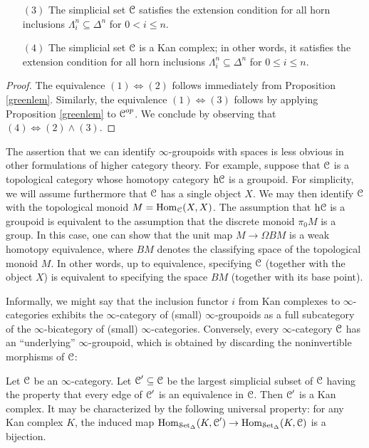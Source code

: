 \begin{Didn't Read}
\begin{proposition}
\begin{itemize}
\item[$(3)$] The simplicial set $\operatorname{\mathcal{C}}$ satisfies the extension condition
for all horn inclusions $\Lambda^n_i \subseteq \Delta^n$ for $0 < i \leq n$.

\item[$(4)$] The simplicial set $\operatorname{\mathcal{C}}$ is a Kan complex; in other words, it
satisfies the extension condition for all horn inclusions
$\Lambda^n_i \subseteq \Delta^n$ for $0 \leq i \leq n$.
\end{itemize}
\end{proposition}

\begin{proof}
The equivalence $(1) \Leftrightarrow (2)$ follows immediately from
Proposition \ref{greenlem}.
Similarly, the equivalence $(1) \Leftrightarrow (3)$ follows by applying Proposition \ref{greenlem} to $\operatorname{\mathcal{C}}^{op}$. We conclude by observing that $(4) \Leftrightarrow (2) \wedge (3)$.
\end{proof}

\begin{remark}
The assertion that we can identify $\infty$-groupoids with spaces is less obvious in other formulations of higher category theory. For example, suppose that $\operatorname{\mathcal{C}}$ is a topological category whose homotopy category $\rm{h} \it{\operatorname{\mathcal{C}}}$ is a groupoid. For simplicity, we will assume furthermore that $\operatorname{\mathcal{C}}$ has a single object $X$. We may then identify $\operatorname{\mathcal{C}}$ with
the topological monoid $M=\operatorname{Hom}_{\operatorname{\mathcal{C}}}(X,X)$. The assumption that
$\rm{h} \it{ \operatorname{\mathcal{C}}}$ is a groupoid is equivalent to the assumption
that the discrete monoid $\pi_0 M$ is a group. In this case, one can show that the 
unit map $M \rightarrow \Omega BM$ is a weak homotopy
equivalence, where $BM$ denotes the classifying space of the
topological monoid $M$. In other words, up to equivalence,
specifying $\operatorname{\mathcal{C}}$ (together with the object $X$) is equivalent to
specifying the space $BM$ (together with its base point).
\end{remark}

Informally, we might say that the inclusion functor $i$ from Kan
complexes to $\infty$-categories exhibits the $\infty$-category of
(small) $\infty$-groupoids as a full subcategory of
the $\infty$-bicategory of (small) $\infty$-categories. Conversely, every
$\infty$-category $\operatorname{\mathcal{C}}$ has an ``underlying'' $\infty$-groupoid, which is obtained by discarding the noninvertible morphisms of $\operatorname{\mathcal{C}}$:

\begin{proposition}\label{lumba}
Let $\operatorname{\mathcal{C}}$ be an $\infty$-category. Let $\operatorname{\mathcal{C}}' \subseteq \operatorname{\mathcal{C}}$ be the largest simplicial
subset of $\operatorname{\mathcal{C}}$ having the property that every edge of $\operatorname{\mathcal{C}}'$ is an equivalence in $\operatorname{\mathcal{C}}$.
Then $\operatorname{\mathcal{C}}'$ is a Kan complex. It may be characterized by the
following universal property: for any Kan complex $K$, the induced
map $\operatorname{Hom}_{\operatorname{\mathcal{S}et_{\Delta}}}(K,\operatorname{\mathcal{C}}') \rightarrow \operatorname{Hom}_{\operatorname{\mathcal{S}et_{\Delta}}}(K,\operatorname{\mathcal{C}})$ is a
bijection.
\end{proposition}


\end{Didn't Read}
